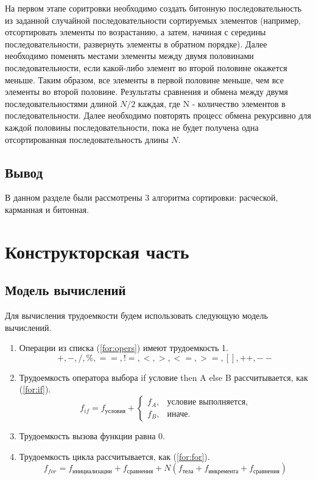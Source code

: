 \documentclass[12pt]{report}
\begin{document}
	На первом этапе соритровки необходимо создать битонную последовательность из заданной случайной последовательности сортируемых элементов (например, отсортировать элементы по возрастанию, а затем, начиная с середины последовательности, развернуть элементы в обратном порядке). Далее необходимо поменять местами элементы между двумя половинами последовательности, если какой-либо элемент во второй половине окажется меньше. Таким образом, все элементы в первой половине меньше, чем все элементы во второй половине. Результаты сравнения и обмена между двумя последовательностями длиной $N/2$ каждая, где N - количество элементов в последовательности. Далее необходимо повторять процесс обмена рекурсивно для каждой половины последовательности, пока не будет получена одна отсортированная последовательность длины $N$.
	
	\section*{Вывод}
	
	В данном разделе были рассмотрены 3 алгоритма сортировки: расческой, карманная и битонная.
	
	\clearpage
	
	\chapter{Конструкторская часть}
	
	\section{Модель вычислений}

	Для вычисления трудоемкости будем использовать следующую модель вычислений.

	\begin{enumerate}
		\item Операции из списка (\ref{for:opers}) имеют трудоемкость 1.
		\begin{equation}
		\label{for:opers}
		+, -, /, \%, ==, !=, <, >, <=, >=, [], ++, {-}-
		\end{equation}
		\item Трудоемкость оператора выбора if условие then A else B рассчитывается, как (\ref{for:if}).
		\begin{equation}
		\label{for:if}
		f_{if} = f_{\text{условия}} +
		\begin{cases}
		f_A, & \text{условие выполняется,}\\
		f_B, & \text{иначе.}
		\end{cases}
		\end{equation}
		\item Трудоемкость вызова функции равна 0.
		\item Трудоемкость цикла рассчитывается, как (\ref{for:for}).
		\begin{equation}
		\label{for:for}
		f_{for} = f_{\text{инициализации}} + f_{\text{сравнения}} + N(f_{\text{тела}} + f_{\text{инкремента}} + f_{\text{сравнения}})
		\end{equation}
	\end{enumerate}
	
\end{document}
